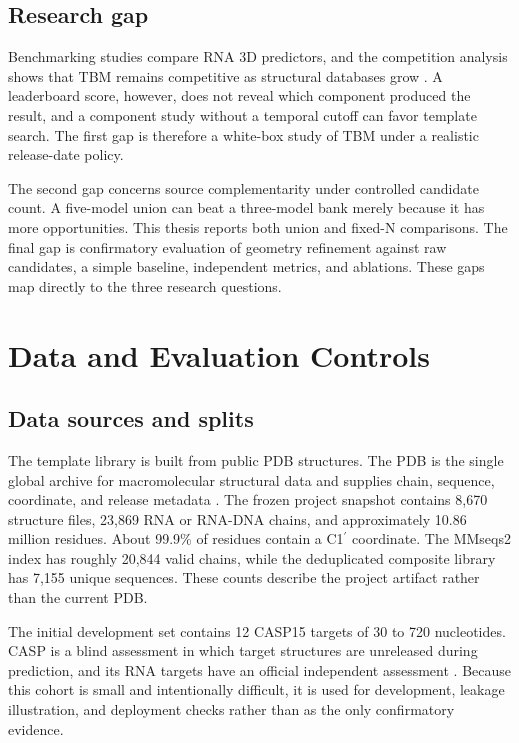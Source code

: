 \documentclass[12pt,a4paper,oneside]{report}
\newcommand{\cprime}{C1$^{\prime}$}
\begin{document}
\section{Research gap}

Benchmarking studies compare RNA 3D predictors, and the competition analysis shows that
TBM remains competitive as structural databases grow
\cite{state_of_rnart,competition_paper}. A leaderboard score, however, does not reveal
which component produced the result, and a component study without a temporal cutoff
can favor template search. The first gap is therefore a white-box study of TBM under a
realistic release-date policy.

The second gap concerns source complementarity under controlled candidate count. A
five-model union can beat a three-model bank merely because it has more opportunities.
This thesis reports both union and fixed-N comparisons. The final gap is confirmatory
evaluation of geometry refinement against raw candidates, a simple baseline, independent
metrics, and ablations. These gaps map directly to the three research questions.

\chapter{Data and Evaluation Controls}
\label{chap:data_en}

\section{Data sources and splits}

The template library is built from public PDB structures. The PDB is the single global
archive for macromolecular structural data and supplies chain, sequence, coordinate, and
release metadata \cite{pdb_archive}. The frozen project snapshot contains 8,670
structure files, 23,869 RNA or RNA-DNA chains, and approximately 10.86 million residues.
About 99.9\% of residues contain a \cprime{} coordinate. The MMseqs2 index has roughly
20,844 valid chains, while the deduplicated composite library has 7,155 unique sequences.
These counts describe the project artifact rather than the current PDB.

The initial development set contains 12 CASP15 targets of 30 to 720 nucleotides. CASP is
a blind assessment in which target structures are unreleased during prediction, and its
RNA targets have an official independent assessment \cite{casp15}. Because this cohort
is small and intentionally difficult, it is used for development, leakage illustration,
and deployment checks rather than as the only confirmatory evidence.
\end{document}
